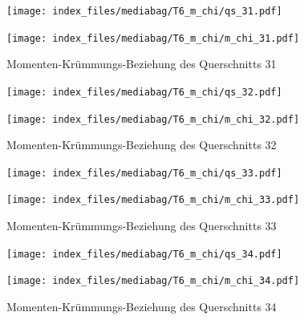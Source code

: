 \documentclass[
  11pt,
  letterpaper,
]{scrreprt}
\begin{document}
\begin{figure}[H]

\begin{minipage}{0.50\linewidth}
\texttt{[image: index\_files/mediabag/T6\_m\_chi/qs\_31.pdf]}\end{minipage}%
%
\begin{minipage}{0.50\linewidth}
\texttt{[image: index\_files/mediabag/T6\_m\_chi/m\_chi\_31.pdf]}\end{minipage}%

\caption{\label{fig-m_chi_appendix}Momenten-Krümmungs-Beziehung des
Querschnitts 31}

\end{figure}%

\begin{figure}[H]

\begin{minipage}{0.50\linewidth}
\texttt{[image: index\_files/mediabag/T6\_m\_chi/qs\_32.pdf]}\end{minipage}%
%
\begin{minipage}{0.50\linewidth}
\texttt{[image: index\_files/mediabag/T6\_m\_chi/m\_chi\_32.pdf]}\end{minipage}%

\caption{\label{fig-m_chi_appendix}Momenten-Krümmungs-Beziehung des
Querschnitts 32}

\end{figure}%

\begin{figure}[H]

\begin{minipage}{0.50\linewidth}
\texttt{[image: index\_files/mediabag/T6\_m\_chi/qs\_33.pdf]}\end{minipage}%
%
\begin{minipage}{0.50\linewidth}
\texttt{[image: index\_files/mediabag/T6\_m\_chi/m\_chi\_33.pdf]}\end{minipage}%

\caption{\label{fig-m_chi_appendix}Momenten-Krümmungs-Beziehung des
Querschnitts 33}

\end{figure}%

\begin{figure}[H]

\begin{minipage}{0.50\linewidth}
\texttt{[image: index\_files/mediabag/T6\_m\_chi/qs\_34.pdf]}\end{minipage}%
%
\begin{minipage}{0.50\linewidth}
\texttt{[image: index\_files/mediabag/T6\_m\_chi/m\_chi\_34.pdf]}\end{minipage}%

\caption{\label{fig-m_chi_appendix}Momenten-Krümmungs-Beziehung des
Querschnitts 34}

\end{figure}%
\end{document}
